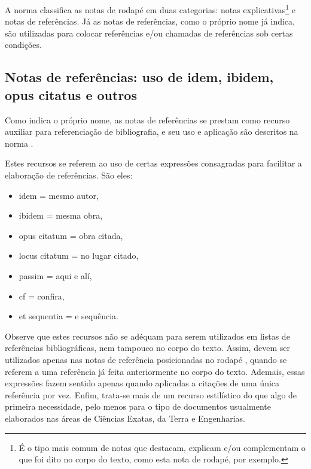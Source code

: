 \begin{apendicesenv}
    A norma  classifica as notas de rodapé em duas categorias: notas explicativas\footnote{É o tipo mais comum de notas que destacam, explicam e/ou complementam o que foi dito no corpo do texto, como esta nota de rodapé, por exemplo.} e notas de referências.
    Já as notas de referências, como o próprio nome já indica, são utilizadas para colocar referências e/ou chamadas de referências sob certas condições\footnotemark{}.


    \subsection{Notas de referências: uso de idem, ibidem, opus citatus e outros}
    \label{subsec_notas_de_referencias}

    Como indica o próprio nome, as notas de referências se prestam como recurso auxiliar para referenciação de bibliografia, e seu uso e aplicação são descritos na norma .

    Estes recursos se referem ao uso de certas expressões consagradas para facilitar a elaboração de referências.
    São eles:

    \begin{itemize}
        \item idem = mesmo autor,
        \item ibidem = mesma obra,
        \item opus citatum = obra citada,
        \item locus citatum = no lugar citado,
        \item passim = aqui e alí,
        \item cf = confira,
        \item et sequentia = e sequência.
    \end{itemize}

    Observe que estes recursos não se adéquam para serem utilizados em listas de referências bibliográficas, nem tampouco no corpo do texto.
    Assim, devem ser utilizados apenas nas notas de referência posicionadas no rodapé \cite[p.~6]{abnTeX22014c}, quando se referem a uma referência já feita anteriormente no corpo do texto.
    Ademais, essas expressões fazem sentido apenas quando aplicadas a citações de uma única referência por vez.
    Enfim, trata-se mais de um recurso estilístico do que algo de primeira necessidade, pelo menos para o tipo de documentos usualmente elaborados nas áreas de Ciências Exatas, da Terra e Engenharias.


\end{apendicesenv}
